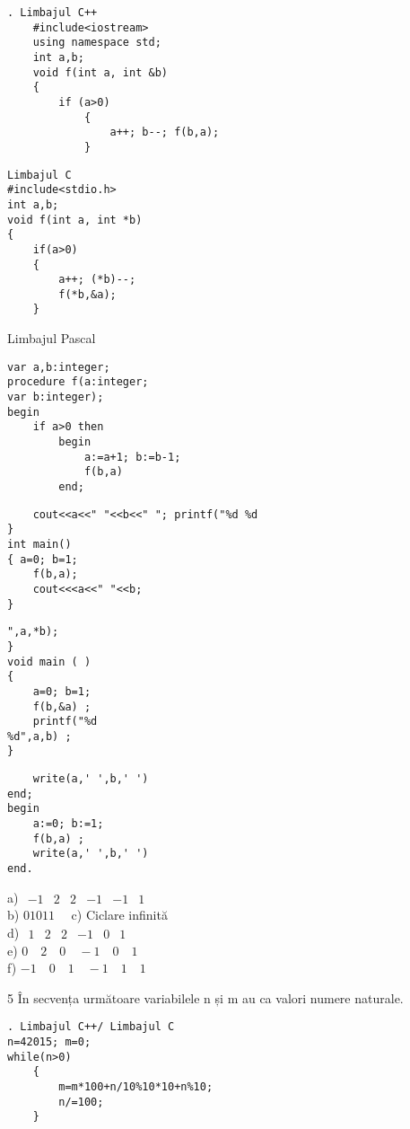 \begin{verbatim}
. Limbajul C++
    #include<iostream>
    using namespace std;
    int a,b;
    void f(int a, int &b)
    {
        if (a>0)
            {
                a++; b--; f(b,a);
            }
\end{verbatim}

\begin{verbatim}
Limbajul C
#include<stdio.h>
int a,b;
void f(int a, int *b)
{
    if(a>0)
    {
        a++; (*b)--;
        f(*b,&a);
    }
\end{verbatim}

Limbajul Pascal

\begin{verbatim}
var a,b:integer;
procedure f(a:integer;
var b:integer);
begin
    if a>0 then
        begin
            a:=a+1; b:=b-1;
            f(b,a)
        end;
\end{verbatim}

\begin{verbatim}
    cout<<a<<" "<<b<<" "; printf("%d %d
}
int main()
{ a=0; b=1;
    f(b,a);
    cout<<<a<<" "<<b;
}
\end{verbatim}

\begin{verbatim}
",a,*b);
}
void main ( )
{
    a=0; b=1;
    f(b,&a) ;
    printf("%d
%d",a,b) ;
}
\end{verbatim}

\begin{verbatim}
    write(a,' ',b,' ')
end;
begin
    a:=0; b:=1;
    f(b,a) ;
    write(a,' ',b,' ')
end.
\end{verbatim}

a) $\begin{array}{llllll}-1 & 2 & 2 & -1 & -1 & 1\end{array}$\\
b) $01011 \quad$ c) Ciclare infinită\\
d) $\begin{array}{llllll}1 & 2 & 2 & -1 & 0 & 1\end{array}$\\
e) $0 \quad 2 \quad 0 \quad-1 \quad 0 \quad 1$\\
f) $-1 \quad 0 \quad 1 \quad-1 \quad 1 \quad 1$

5 În secvența următoare variabilele n și m au ca valori numere naturale.

\begin{verbatim}
. Limbajul C++/ Limbajul C
n=42015; m=0;
while(n>0)
    {
        m=m*100+n/10%10*10+n%10;
        n/=100;
    }
\end{verbatim}

